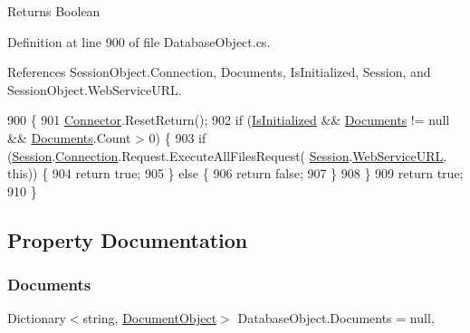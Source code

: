 \begin{DoxyReturn}{Returns}
Boolean
\end{DoxyReturn}


Definition at line 900 of file Database\+Object.\+cs.



References Session\+Object.\+Connection, Documents, Is\+Initialized, Session, and Session\+Object.\+Web\+Service\+U\+RL.


\begin{DoxyCode}
900                                     \{
901         \mbox{\hyperlink{class_connector}{Connector}}.ResetReturn();
902         \textcolor{keywordflow}{if} (\mbox{\hyperlink{class_database_object_a5fe036d32a30eb10d1b3f6a30263f740}{IsInitialized}} && \mbox{\hyperlink{class_database_object_afaf1159aa427c5bcce01c4b8c6f34514}{Documents}} != null && 
      \mbox{\hyperlink{class_database_object_afaf1159aa427c5bcce01c4b8c6f34514}{Documents}}.Count > 0) \{
903             \textcolor{keywordflow}{if} (\mbox{\hyperlink{class_database_object_aa8484162b7d2a7c4c9426bca13c64c07}{Session}}.\mbox{\hyperlink{class_session_object_a014bdbf705a753540e19bfb53030c55c}{Connection}}.Request.ExecuteAllFilesRequest(
      \mbox{\hyperlink{class_database_object_aa8484162b7d2a7c4c9426bca13c64c07}{Session}}.\mbox{\hyperlink{class_session_object_a697c071c812fbf7ad1166b896fb44c16}{WebServiceURL}}, \textcolor{keyword}{this})) \{
904                 \textcolor{keywordflow}{return} \textcolor{keyword}{true};
905             \} \textcolor{keywordflow}{else} \{
906                 \textcolor{keywordflow}{return} \textcolor{keyword}{false};
907             \}
908         \}
909         \textcolor{keywordflow}{return} \textcolor{keyword}{true};
910     \}
\end{DoxyCode}


\subsection{Property Documentation}
\mbox{\label{class_database_object_afaf1159aa427c5bcce01c4b8c6f34514}} 
\subsubsection{\texorpdfstring{Documents}{Documents}}
{\footnotesize\ttfamily Dictionary$<$string, \mbox{\hyperlink{class_document_object}{Document\+Object}}$>$ Database\+Object.\+Documents = null\hspace{0.3cm}{\ttfamily [get]}, {\ttfamily [set]}}



